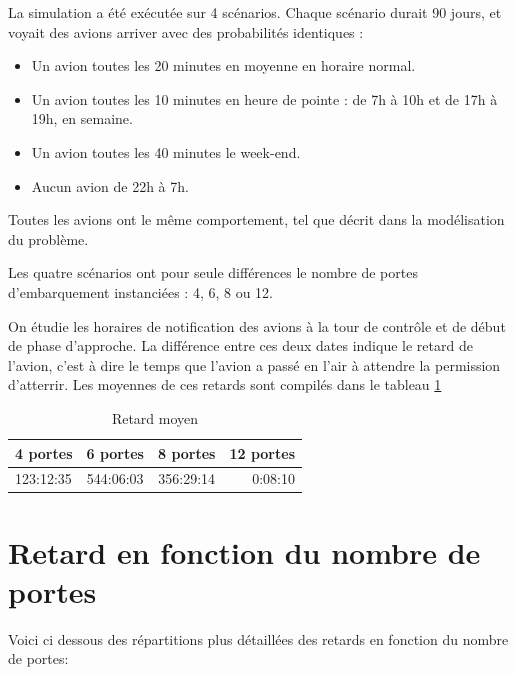 
La simulation a été exécutée sur 4 scénarios. Chaque scénario durait 90 jours, et voyait des avions arriver avec des probabilités identiques :
\begin{itemize}
  \item Un avion toutes les 20 minutes en moyenne en horaire normal.
  \item Un avion toutes les 10 minutes en heure de pointe : de 7h à 10h et de 17h à 19h, en semaine.
  \item Un avion toutes les 40 minutes le week-end.
  \item Aucun avion de 22h à 7h.
\end{itemize}
Toutes les avions ont le même comportement, tel que décrit dans la modélisation du problème.

Les quatre scénarios ont pour seule différences le nombre de portes d'embarquement instanciées : 4, 6, 8 ou 12.

On étudie les horaires de notification des avions à la tour de contrôle et de début de phase d'approche. La différence entre ces deux dates indique le retard de l'avion, c'est à dire le temps que l'avion a passé en l'air à attendre la permission d'atterrir. Les moyennes de ces retards sont compilés dans le tableau \ref{retard_moyen}

\begin{table}[h]
\begin{center}
\begin{tabular}{|l|c|c|r|}
  \hline
  4 portes & 6 portes & 8 portes & 12 portes \\
  \hline
  123:12:35 & 544:06:03 & 356:29:14 & 0:08:10\\
  \hline
\end{tabular}
   \caption{\label{retard_moyen} Retard moyen}
\end{center}
\end{table}

\section{Retard en fonction du nombre de portes}
Voici ci dessous des répartitions plus détaillées des retards en fonction du nombre de portes:

